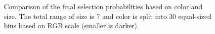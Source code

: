 \documentclass[letterpaper]{article} %
\begin{document}
\begin{figure}[ht]
\centering
{}
\caption{
Comparison of the final selection probabilities based on color and size. The total range of size is 7 and color is split into 30 equal-sized bins based on RGB scale (smaller is darker).
}
\label{fig:plot-select}
\end{figure}
\end{document}

